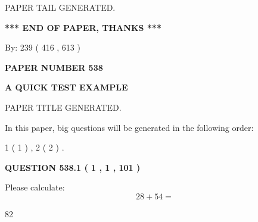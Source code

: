 \documentclass[12pt]{article}
\begin{document}
\vspace{2.0in} PAPER TAIL GENERATED.
   
   
   
   
\vspace{1.0in} 
{\textbf{\large{ *** END OF PAPER, THANKS *** }}} 
   
   
\hspace{1.0in} By: 
 239 ( 416 ,  613 )
   
   
   
   
\newpage 
\setcounter{page}{ 
   538001 } 
   
   
   
   
 {\textbf{ \Large{ PAPER NUMBER  538  }}}
   
   
\vspace{0.2in}
   
   
   
   
   
   
   
   
 \vspace{0.2in}
{\LARGE {\textbf{ A QUICK TEST EXAMPLE}}}
   
   
 PAPER TITLE GENERATED.
   
   
   
\vspace{0.2in}
   
In this paper, big questions will be generated in the following order: 
   
   
   1 ( 1 )
 ,
   2 ( 2 )
 .
  
\vspace{0.2in}
  
{\textbf{\Large{QUESTION
538.1 
 ( 1 , 1 , 101 )
}}}
  
  
 
Please calculate:
\begin{equation}
28 +  %
54 = \nonumber
\end{equation}
 
 
 
\noindent{}
 
 

82
 
 
\noindent{}
 
 

 
 
\end{document}
